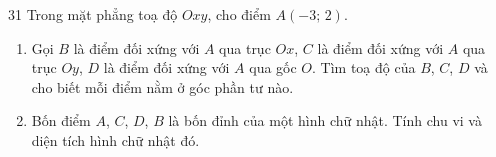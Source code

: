 \clearpage
{}

\begin{probbox}{31}{\relax}
Trong mặt phẳng toạ độ $Oxy$, cho điểm $A(-3;\,2)$.
\begin{enumerate}[label=\alph*),leftmargin=1.6em,itemsep=0pt,topsep=2pt]
  \item Gọi $B$ là điểm đối xứng với $A$ qua trục $Ox$, $C$ là điểm đối xứng với $A$ qua trục $Oy$, $D$ là điểm đối xứng với $A$ qua gốc $O$. Tìm toạ độ của $B$, $C$, $D$ và cho biết mỗi điểm nằm ở góc phần tư nào.
  \item Bốn điểm $A$, $C$, $D$, $B$ là bốn đỉnh của một hình chữ nhật. Tính chu vi và diện tích hình chữ nhật đó.
\end{enumerate}
\end{probbox}
